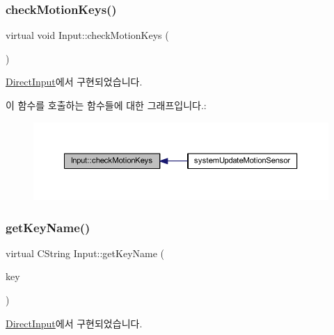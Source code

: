 \subsubsection{\texorpdfstring{check\+Motion\+Keys()}{checkMotionKeys()}}
{\footnotesize\ttfamily virtual void Input\+::check\+Motion\+Keys (\begin{DoxyParamCaption}{ }\end{DoxyParamCaption})\hspace{0.3cm}{\ttfamily [pure virtual]}}



\mbox{\hyperlink{class_direct_input_a6e54dc09ff20e12dfe98a24607172c34}{Direct\+Input}}에서 구현되었습니다.

이 함수를 호출하는 함수들에 대한 그래프입니다.\+:
\nopagebreak
\begin{figure}[H]
\begin{center}
\leavevmode
\includegraphics[width=350pt]{class_input_aac8f25a1a6a7e0bd54e5d50b9b774844_icgraph}
\end{center}
\end{figure}
\mbox{\label{class_input_a2c4ec8a744b040657e220480987cd8bf}} 
\subsubsection{\texorpdfstring{get\+Key\+Name()}{getKeyName()}}
{\footnotesize\ttfamily virtual C\+String Input\+::get\+Key\+Name (\begin{DoxyParamCaption}\item[{L\+O\+N\+G\+\_\+\+P\+TR}]{key }\end{DoxyParamCaption})\hspace{0.3cm}{\ttfamily [pure virtual]}}



\mbox{\hyperlink{class_direct_input_a8ea2797da0b1e806227628804591f63d}{Direct\+Input}}에서 구현되었습니다.

